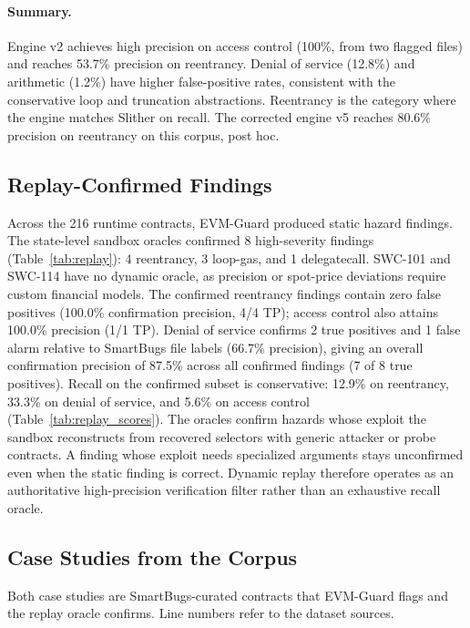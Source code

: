 \documentclass[pdflatex,sn-mathphys]{sn-jnl}
\theoremstyle{thmstyleone}
\theoremstyle{thmstyletwo}
\begin{document}
\paragraph{Summary.} Engine v2 achieves high precision on access control (100\%, from two flagged files) and reaches 53.7\% precision on reentrancy. Denial of service (12.8\%) and arithmetic (1.2\%) have higher false-positive rates, consistent with the conservative loop and truncation abstractions. Reentrancy is the category where the engine matches Slither on recall. The corrected engine v5 reaches 80.6\% precision on reentrancy on this corpus, post hoc.

\subsection{Replay-Confirmed Findings}\label{sec:results:replay}
Across the 216 runtime contracts, EVM-Guard produced static hazard findings. The state-level sandbox oracles confirmed 8 high-severity findings (Table~\ref{tab:replay}): 4 reentrancy, 3 loop-gas, and 1 delegatecall. SWC-101 and SWC-114 have no dynamic oracle, as precision or spot-price deviations require custom financial models. The confirmed reentrancy findings contain zero false positives (100.0\% confirmation precision, 4/4 TP); access control also attains 100.0\% precision (1/1 TP). Denial of service confirms 2 true positives and 1 false alarm relative to SmartBugs file labels (66.7\% precision), giving an overall confirmation precision of 87.5\% across all confirmed findings (7 of 8 true positives). Recall on the confirmed subset is conservative: 12.9\% on reentrancy, 33.3\% on denial of service, and 5.6\% on access control (Table~\ref{tab:replay_scores}). The oracles confirm hazards whose exploit the sandbox reconstructs from recovered selectors with generic attacker or probe contracts. A finding whose exploit needs specialized arguments stays unconfirmed even when the static finding is correct. Dynamic replay therefore operates as an authoritative high-precision verification filter rather than an exhaustive recall oracle.

\subsection{Case Studies from the Corpus}\label{sec:case_studies}
Both case studies are SmartBugs-curated contracts that EVM-Guard flags and the replay oracle confirms. Line numbers refer to the dataset sources.
\end{document}
